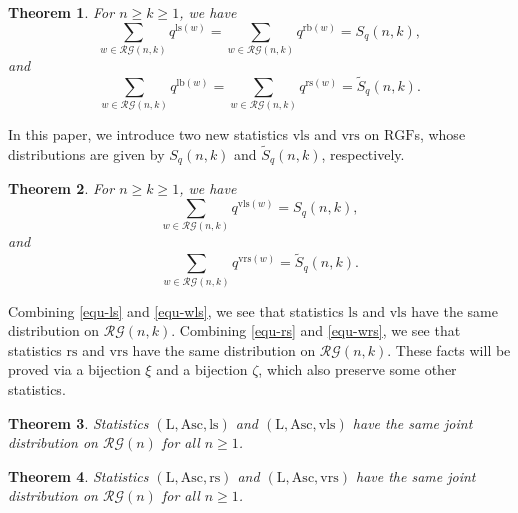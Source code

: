 \documentclass[12pt]{amsart}
\numberwithin{equation}{section}
\theoremstyle{plain}
\newtheorem{theorem}{Theorem}[section]
\theoremstyle{definition}
\def\RGF{\mathrm{RGF}}
\def\lb{\mathrm{lb}}
\def\ls{\mathrm{ls}}
\def\rb{\mathrm{rb}}
\def\rs{\mathrm{rs}}
\def\wrs{\mathrm{vrs}}
\def\wls{\mathrm{vls}}
\def\Asc{\mathrm{Asc}}
\def\LL{\mathrm{L}}
\def\RG{\mathcal{RG}}
\begin{document}
\begin{theorem}\label{thm-WW}
For $n \geq k \geq 1$, we have
\begin{equation}\label{equ-ls}
  \sum_{w \in \RG(n,k)}q^{\ls(w)}=\sum_{w \in \RG(n,k)}q^{\rb(w)}=S_q(n,k),
\end{equation}
and
\begin{equation}\label{equ-rs}
  \sum_{w \in \RG(n,k)}q^{\lb(w)}=\sum_{w \in \RG(n,k)}q^{\rs(w)}=\widetilde{S}_q(n,k).
\end{equation}
\end{theorem}


In this paper, we introduce two new statistics $\wls$ and $\wrs$ on $\RGF$s, whose distributions are
given by $S_q(n,k)$ and $\widetilde{S}_q(n,k)$, respectively.



\begin{theorem} \label{main-rgf}
For $n \geq k \geq 1$, we have
\begin{equation}\label{equ-wls}
  \sum_{w \in \RG(n,k)}q^{\wls(w)}=S_q(n,k),
\end{equation}
and
\begin{equation}\label{equ-wrs}
  \sum_{w \in \RG(n,k)}q^{\wrs(w)}=\widetilde{S}_q(n,k).
\end{equation}
\end{theorem}

Combining \eqref{equ-ls} and \eqref{equ-wls}, we see that statistics
$\ls$ and $\wls$ have the same distribution on $\RG(n,k)$.
Combining \eqref{equ-rs} and \eqref{equ-wrs}, we see that statistics
$\rs$ and $\wrs$ have the same distribution on $\RG(n,k)$.
 These facts will be proved via a bijection $\xi$ and a bijection $\zeta$, which also preserve some other statistics.

\begin{theorem}\label{main-bijection}
Statistics $(\LL, \Asc, \ls)$ and
$(\LL, \Asc, \wls)$ have the same joint distribution on $\RG(n)$ for all $n \geq 1$.
\end{theorem}

\begin{theorem}\label{main-bijection-r}
Statistics $(\LL, \Asc, \rs)$ and
$(\LL, \Asc, \wrs)$ have the same joint distribution on $\RG(n)$ for all $n \geq  1$.
\end{theorem}
\end{document}
